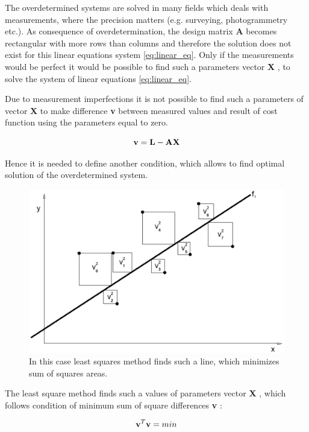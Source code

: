 \documentclass[a4paper,12pt]{article}
\newcommand{\ematr}[1]{
{\bf #1}
}
\newcommand{\evect}[1]{
{\bf #1}
}
\begin{document}
The overdetermined systems are solved in many fields which deals with measurements, where the precision matters (e.g. 
surveying, photogrammetry etc.).
As consequence of overdetermination, the design matrix \ematr{A} becomes rectangular with more rows than columns 
and therefore the solution does not exist for this linear equations system \eqref{eq:linear_eq}.
Only if the measurements would be perfect it would be possible to find such a parameters vector \evect{X}, to 
solve the system of linear equations \eqref{eq:linear_eq}. 

Due to measurement imperfections it is not possible to find such a parameters of vector \evect{X} to make difference \evect{v} between measured values and 
result of cost function using the parameters equal to zero.

\begin{equation}
\label{eq:least_v}
\evect{v} = \evect{L} - \ematr{A}\evect{X}
\end{equation} 



Hence it is needed to define another condition, which allows to find optimal solution of the 
overdetermined system.

\begin{figure}[h]
    \centering
    \includegraphics[scale=0.2]{figures/squares.png}
    \caption{In this case least squares method finds such a line,
    which minimizes sum of squares areas. }
    \label{fig:squares}
\end{figure}

The least square method finds such a values of parameters vector \evect{X}, which 
follows condition of minimum sum of square differences \evect{v}: 

\begin{equation}
\evect{v}^{T} \evect{v} = min
\end{equation} 
\end{document}
